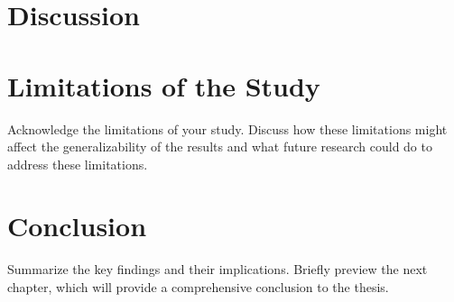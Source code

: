 \section{Discussion}
\section{Limitations of the Study}
Acknowledge the limitations of your study. Discuss how these limitations might
affect the generalizability of the results and what future research could do to
address these limitations.


\section{Conclusion}
Summarize the key findings and their implications. Briefly preview the next
chapter, which will provide a comprehensive conclusion to the thesis.
